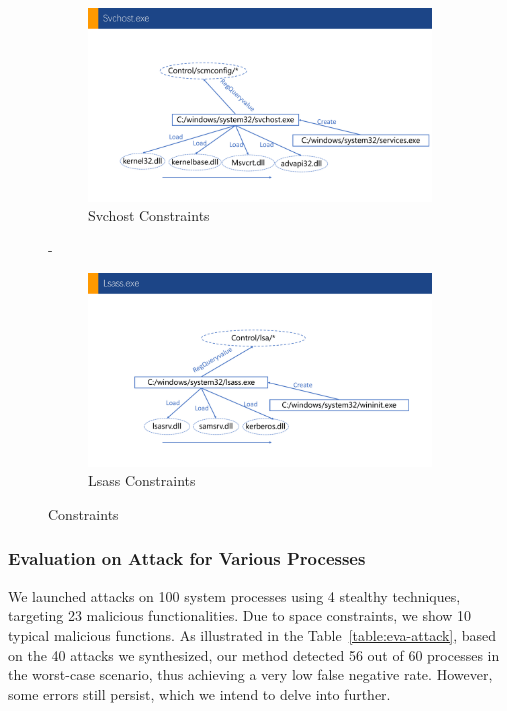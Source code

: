 \begin{figure}
\begin{minipage}[b]{0.34\textwidth}
  \begin{subfigure}{.99\textwidth}
      \includegraphics[width=\textwidth]{figs/svchost.pdf}
      \caption{Svchost Constraints}
      \label{fig:svc-cons}
  \end{subfigure}
  \hfill
  -\vspace{0.9cm}
  \begin{subfigure}{.99\textwidth}
      \includegraphics[width=\textwidth]{figs/lsass.pdf}
      \caption{Lsass Constraints}
      \label{fig:lsass-cons}
  \end{subfigure}
\caption{Constraints}
\label{fig-fdh}
\end{minipage}
\end{figure}

\subsubsection{Evaluation on Attack for Various Processes}

We launched attacks on 100 system processes using 4 stealthy techniques, targeting 23 malicious functionalities. Due to space constraints, we show 10 typical malicious functions.
As illustrated in the Table~\ref{table:eva-attack}, based on the 40 attacks we synthesized, our method detected 56 out of 60 processes in the worst-case scenario, thus achieving a very low false negative rate.
However, some errors still persist, which we intend to delve into further.

